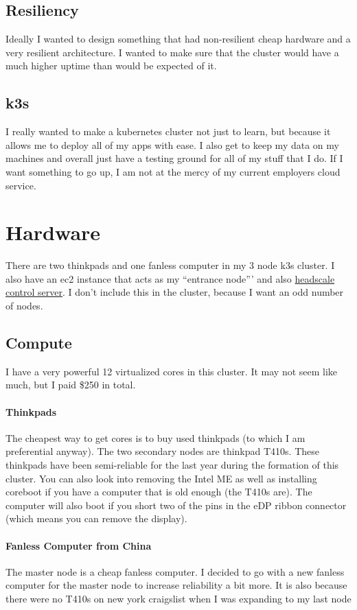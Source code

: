 \documentclass[12pt]{article}
\begin{document}
\subsection{Resiliency}
Ideally I wanted to design something that had non-resilient cheap hardware and a very resilient architecture. I wanted to make sure that the cluster would have a much higher uptime than would be expected of it.

\subsection{k3s}
I really wanted to make a kubernetes cluster not just to learn, but because it allows me to deploy all of my apps with ease. I also get to keep my data on my machines and overall just have a testing ground for all of my stuff that I do. If I want something to go up, I am not at the mercy of my current employers cloud service.

\section{Hardware}
There are two thinkpads and one fanless computer in my 3 node k3s cluster. I also have an ec2 instance that acts as my ``entrance node''' and also \hyperref[sec:Headscale]{headscale control server}. I don't include this in the cluster, because I want an odd number of nodes.
\subsection{Compute}
I have a very powerful 12 virtualized cores in this cluster. It may not seem like much, but I paid \$250 in total.
\paragraph{Thinkpads}
The cheapest way to get cores is to buy used thinkpads (to which I am preferential anyway). The two secondary nodes are thinkpad T410s. These thinkpads have been semi-reliable for the last year during the formation of this cluster. You can also look into removing the Intel ME as well as installing coreboot if you have a computer that is old enough (the T410s are). The computer will also boot if you short two of the pins in the eDP ribbon connector (which means you can remove the display).

\paragraph{Fanless Computer from China}
The master node is a cheap fanless computer. I decided to go with a new fanless computer for the master node to increase reliability a bit more. It is also because there were no T410s on new york craigslist when I was expanding to my last node
\end{document}

